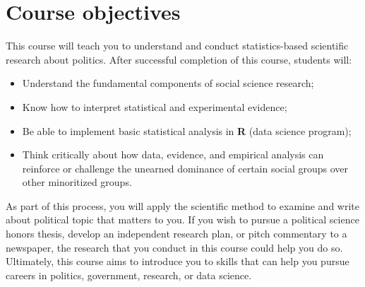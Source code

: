 \documentclass[11pt]{article}
\begin{document}

\section*{Course objectives}

This course will teach you to understand and conduct statistics-based scientific research about politics. After successful completion of this course, students will: 

\begin{itemize}
    \item Understand the fundamental components of social science research; 
    \item Know how to interpret statistical and experimental evidence;
    \item Be able to implement basic statistical analysis in \textbf{\textsf{R}} (data science program);
    \item Think critically about how data, evidence, and empirical analysis can reinforce or challenge the unearned dominance of certain social groups over other minoritized groups. 
   
\end{itemize}
\noindent  %

\noindent As part of this process, you will apply the scientific method to examine and write about political topic that matters to you. %
If you wish to pursue a political science honors thesis, develop an independent research plan, or pitch commentary to a newspaper, the research that you conduct in this course could help you do so. Ultimately, this course aims to introduce you to skills that can help you pursue careers in politics, government, research, or data science.
\end{document}
